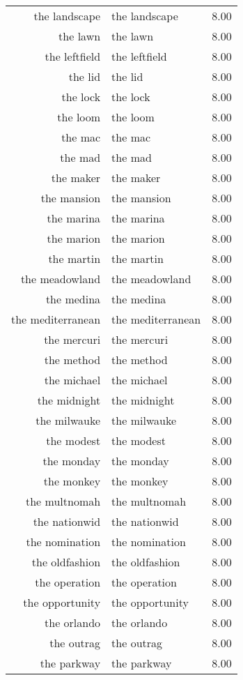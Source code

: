 \begin{table}[ht]
\begin{tabular}{rlr}
  the landscape & the landscape & 8.00 \\ 
  the lawn & the lawn & 8.00 \\ 
  the leftfield & the leftfield & 8.00 \\ 
  the lid & the lid & 8.00 \\ 
  the lock & the lock & 8.00 \\ 
  the loom & the loom & 8.00 \\ 
  the mac & the mac & 8.00 \\ 
  the mad & the mad & 8.00 \\ 
  the maker & the maker & 8.00 \\ 
  the mansion & the mansion & 8.00 \\ 
  the marina & the marina & 8.00 \\ 
  the marion & the marion & 8.00 \\ 
  the martin & the martin & 8.00 \\ 
  the meadowland & the meadowland & 8.00 \\ 
  the medina & the medina & 8.00 \\ 
  the mediterranean & the mediterranean & 8.00 \\ 
  the mercuri & the mercuri & 8.00 \\ 
  the method & the method & 8.00 \\ 
  the michael & the michael & 8.00 \\ 
  the midnight & the midnight & 8.00 \\ 
  the milwauke & the milwauke & 8.00 \\ 
  the modest & the modest & 8.00 \\ 
  the monday & the monday & 8.00 \\ 
  the monkey & the monkey & 8.00 \\ 
  the multnomah & the multnomah & 8.00 \\ 
  the nationwid & the nationwid & 8.00 \\ 
  the nomination & the nomination & 8.00 \\ 
  the oldfashion & the oldfashion & 8.00 \\ 
  the operation & the operation & 8.00 \\ 
  the opportunity & the opportunity & 8.00 \\ 
  the orlando & the orlando & 8.00 \\ 
  the outrag & the outrag & 8.00 \\ 
  the parkway & the parkway & 8.00 \\ 

\end{tabular}
\end{table}
